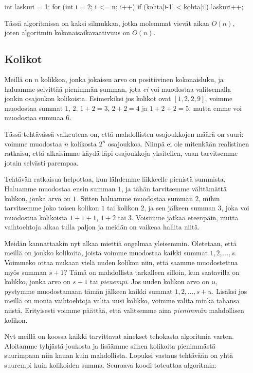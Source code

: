 \begin{code}
int laskuri = 1;
for (int i = 2; i <= n; i++) {
    if (kohta[i-1] < kohta[i]) {
        laskuri++;
    }
}
\end{code}

Tässä algoritmissa on kaksi silmukkaa, jotka molemmat
vievät aikaa $O(n)$, joten algoritmin kokonaisaikavaativuus on $O(n)$.

\subsection{Kolikot}

Meillä on $n$ kolikkoa, jonka jokaisen arvo on positiivinen kokonaisluku,
ja haluamme selvittää pienimmän summan, jota \emph{ei} voi muodostaa
valitsemalla jonkin osajoukon kolikoista.
Esimerkiksi jos kolikot ovat $[1,2,2,9]$, voimme muodostaa summat
$1$, $2$, $1+2=3$, $2+2=4$ ja $1+2+2=5$,
mutta emme voi muodostaa summaa $6$.

Tässä tehtävässä vaikeutena on, että mahdollisten osajoukkojen
määrä on suuri: voimme muodostaa $n$ kolikosta $2^n$ osajoukkoa.
Niinpä ei ole mitenkään realistinen ratkaisu,
että alkaisimme käydä läpi osajoukkoja yksitellen,
vaan tarvitsemme jotain selvästi parempaa.

Tehtävän ratkaisua helpottaa, kun lähdemme liikkeelle pienistä summista.
Haluamme muodostaa ensin summan $1$, ja tähän tarvitsemme välttämättä
kolikon, jonka arvo on $1$.
Sitten haluamme muodostaa summan $2$, mihin tarvitsemme joko
toisen kolikon $1$ tai kolikon $2$, ja sen jälkeen summan $3$,
joka voi muodostua kolikoista $1+1+1$, $1+2$ tai $3$.
Voisimme jatkaa eteenpäin, mutta vaihtoehtoja alkaa tulla
paljon ja meidän on vaikeaa hallita niitä.

Meidän kannattaakin nyt alkaa miettiä ongelmaa yleisemmin.
Oletetaan, että meillä on joukko kolikoita,
joista voimme muodostaa kaikki summat $1,2,\dots,s$.
Voimmeko ottaa mukaan vielä uuden kolikon niin,
että saamme muodostettua myös summan $s+1$?
Tämä on mahdollista tarkalleen silloin, kun saatavilla on kolikko,
jonka arvo on $s+1$ tai \emph{pienempi}.
Jos uuden kolikon arvo on $u$, pystymme muodostamaan tämän jälkeen
kaikki summat $1,2,\dots,s+u$.
Lisäksi jos meillä on monia vaihtoehtoja valita uusi kolikko,
voimme valita minkä tahansa niistä.
Erityisesti voimme päättää, että valitsemme aina
\emph{pienimmän} mahdollisen kolikon.

Nyt meillä on koossa kaikki tarvittavat ainekset
tehokasta algoritmia varten.
Aloitamme tyhjästä joukosta ja lisäämme siihen kolikoita
pienimmästä suurimpaan niin kauan kuin mahdollista.
Lopuksi vastaus tehtävään on yhtä suurempi kuin kolikoiden
summa.
Seuraava koodi toteuttaa algoritmin:

